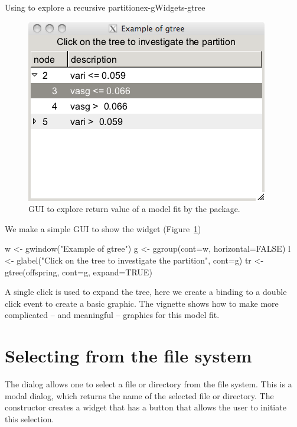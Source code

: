 \begin{example}{Using  to explore a recursive partition}{ex-gWidgets-gtree}
\begin{figure}
  \centering
  \includegraphics[width=.5\textwidth]{ex-gWidgets-gtree}
  \caption{GUI to explore return value of a model fit by the   package.}
  \label{fig:ex-gWidgets-gtree-party}
\end{figure}


We make a simple GUI to show the widget (Figure~\ref{fig:ex-gWidgets-gtree-party})
\begin{Schunk}
\begin{Sinput}
 w <- gwindow("Example of gtree")
 g <- ggroup(cont=w, horizontal=FALSE)
 l <- glabel("Click on the tree to investigate the partition", 
             cont=g)
 tr <- gtree(offspring, cont=g, expand=TRUE)
\end{Sinput}
\end{Schunk}

A single click is used to expand the tree, here we create a binding to  a double
click event to create a basic graphic. The vignette shows how to make more
complicated -- and meaningful -- graphics for this model fit.
\begin{Schunk}
\end{Schunk}
\end{example}

\section{Selecting from the file system}
\label{sec:gWidgets-selecting-from-file}

The  dialog allows one to select a file or directory
from the file system. This is a modal dialog, which returns the name
of the selected file or directory. The 
constructor creates a widget that has a button that allows the user to
initiate this selection.  

